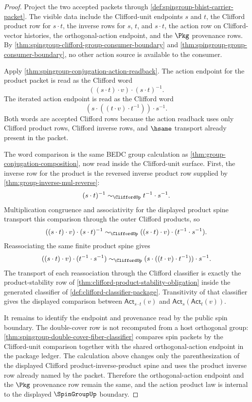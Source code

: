\begin{proof}
Project the two accepted packets through
\autoref{def:spingroup-bhist-carrier-packet}. The visible data include the
Clifford-unit endpoints $s$ and $t$, the Clifford product row for $s\cdot t$,
the inverse rows for $s$, $t$, and $s\cdot t$, the action row on Clifford-vector
histories, the orthogonal-action endpoint, and the $\Pkg$ provenance rows.
By \autoref{thm:spingroup-clifford-group-consumer-boundary} and
\autoref{thm:spingroup-group-consumer-boundary}, no other action source is
available to the consumer.

Apply \autoref{thm:spingroup-conjugation-action-readback}. The action endpoint
for the product packet is read as the Clifford word
$$
((s\cdot t)\cdot v)\cdot (s\cdot t)^{-1}.
$$
The iterated action endpoint is read as the Clifford word
$$
(s\cdot ((t\cdot v)\cdot t^{-1}))\cdot s^{-1}.
$$
Both words are accepted Clifford rows because the action readback uses only
Clifford product rows, Clifford inverse rows, and $\hsame$ transport already
present in the packet.

The word comparison is the same BEDC group calculation as
\autoref{thm:group-conjugation-composition}, now read inside the Clifford-unit
surface. First, the inverse row for the product is the reversed inverse product
row supplied by \autoref{thm:group-inverse-mul-reverse}:
$$
(s\cdot t)^{-1}\sim_{\CliffordUp}t^{-1}\cdot s^{-1}.
$$
Multiplication congruence and associativity for the displayed product spine
transport this comparison through the outer Clifford products, so
$$
((s\cdot t)\cdot v)\cdot (s\cdot t)^{-1}
\sim_{\CliffordUp}
((s\cdot t)\cdot v)\cdot (t^{-1}\cdot s^{-1}).
$$
Reassociating the same finite product spine gives
$$
((s\cdot t)\cdot v)\cdot (t^{-1}\cdot s^{-1})
\sim_{\CliffordUp}
(s\cdot ((t\cdot v)\cdot t^{-1}))\cdot s^{-1}.
$$
The transport of each reassociation through the Clifford classifier is exactly
the product-stability row of \autoref{thm:clifford-product-stability-obligation}
inside the generated classifier of \autoref{def:clifford-classifier-package}.
Transitivity of that classifier gives the displayed comparison between
$\mathsf{Act}_{s\cdot t}(v)$ and $\mathsf{Act}_{s}(\mathsf{Act}_{t}(v))$.

It remains to identify the endpoint and provenance read by the public spin
boundary. The double-cover row is not recomputed from a host orthogonal group:
\autoref{thm:spingroup-double-cover-fiber-classifier} compares spin packets by
the Clifford-unit comparison together with the shared orthogonal-action
endpoint in the package ledger. The calculation above changes only the
parenthesization of the displayed Clifford product-inverse-product spine and
uses the product inverse row already named by the packet. Therefore the
orthogonal-action endpoint and the $\Pkg$ provenance row remain the same, and
the action product law is internal to the displayed $\SpinGroupUp$ boundary.
\end{proof}

